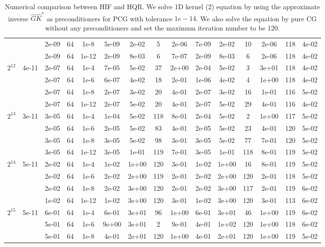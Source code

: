 \documentclass[11pt]{article}
\begin{document}
\begin{table}[!htbp]
\begin{tabular}{|c|c|c|c|c|c|c|c|c|c|c|c|c|c|c|}
~ & ~ & 2e-09 & 64 & 1e-8 & 5e-09 & 2e-02 & 5 & 2e-06 & 7e-09 & 2e-02 & 10 & 2e-06 & 118 & 4e-02\\
~ & ~ & 2e-09 & 64 & 1e-12 & 2e-09 & 8e-03 & 6 & 7e-07 & 2e-09 & 8e-03 & 6 & 2e-06 & 118 & 4e-02\\
\hline
$2^{12}$ & 4e-11 & 2e-07 & 64 & 1e-4 & 7e-05 & 5e-02 & 37 & 2e+00 & 2e-04 & 5e-02 & 3 & 3e+01 & 118 & 4e-02\\
~ & ~ & 2e-07 & 64 & 1e-6 & 6e-07 & 4e-02 & 18 & 2e-01 & 1e-06 & 4e-02 & 4 & 1e+00 & 118 & 4e-02\\
~ & ~ & 2e-07 & 64 & 1e-8 & 2e-07 & 3e-02 & 20 & 4e-01 & 2e-07 & 3e-02 & 16 & 1e-01 & 116 & 5e-02\\
~ & ~ & 2e-07 & 64 & 1e-12 & 2e-07 & 5e-02 & 20 & 4e-01 & 2e-07 & 5e-02 & 29 & 4e-01 & 116 & 4e-02\\
\hline
$2^{13}$ & 3e-11 & 3e-05 & 64 & 1e-4 & 1e-04 & 5e-02 & 118 & 8e-01 & 2e-04 & 5e-02 & 2 & 1e+00 & 117 & 5e-02\\
~ & ~ & 2e-05 & 64 & 1e-6 & 2e-05 & 5e-02 & 83 & 4e-01 & 2e-05 & 5e-02 & 23 & 4e-01 & 120 & 5e-02\\
~ & ~ & 3e-05 & 64 & 1e-8 & 3e-05 & 5e-02 & 98 & 3e-01 & 3e-05 & 5e-02 & 77 & 7e-01 & 120 & 5e-02\\
~ & ~ & 3e-05 & 64 & 1e-12 & 3e-05 & 1e-01 & 119 & 7e-01 & 3e-05 & 1e-01 & 118 & 8e-01 & 119 & 5e-02\\
\hline
$2^{14}$ & 5e-11 & 2e-02 & 64 & 1e-4 & 1e-02 & 1e+00 & 120 & 3e-01 & 1e-02 & 1e+00 & 16 & 8e-01 & 119 & 5e-02\\
~ & ~ & 2e-02 & 64 & 1e-6 & 2e-02 & 2e+00 & 119 & 2e-01 & 2e-02 & 2e+00 & 120 & 2e-01 & 118 & 5e-02\\
~ & ~ & 2e-02 & 64 & 1e-8 & 2e-02 & 3e+00 & 120 & 2e-01 & 2e-02 & 3e+00 & 117 & 2e-01 & 119 & 6e-02\\
~ & ~ & 1e-02 & 64 & 1e-12 & 1e-02 & 3e+00 & 120 & 3e-01 & 1e-02 & 3e+00 & 120 & 3e-01 & 113 & 6e-02\\
\hline
$2^{15}$ & 5e-11 & 6e-01 & 64 & 1e-4 & 6e-01 & 3e+01 & 96 & 1e+00 & 6e-01 & 3e+01 & 46 & 1e+00 & 119 & 6e-02\\
~ & ~ & 5e-01 & 64 & 1e-6 & 9e+00 & 3e+01 & 2 & 9e-01 & 4e-01 & 1e+02 & 120 & 1e+00 & 118 & 6e-02\\
~ & ~ & 5e-01 & 64 & 1e-8 & 4e-01 & 2e+01 & 120 & 1e+00 & 4e-01 & 2e+01 & 120 & 1e+00 & 119 & 5e-02\\



\end{tabular}

\caption{Numerical comparison between HIF and HQR. We solve 1D kernel (2) equation by using the approximate inverse $\hat{G}\hat{K}^{*}$ as preconditioners for PCG with tolerance $1e-14$. We also solve the equation by pure CG without any preconditioners and set the maximum iteration number to be 120.}
\label{1d-k2}
\end{table}
\end{document}
